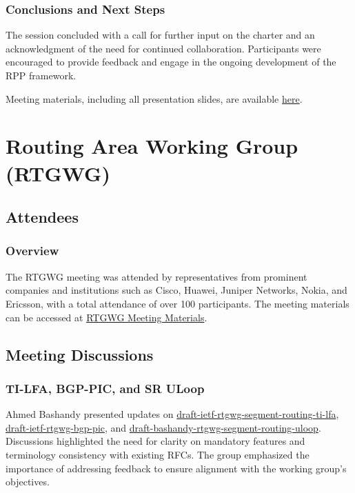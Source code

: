 \documentclass{article}
\begin{document}
\subsubsection{Conclusions and Next Steps}
The session concluded with a call for further input on the charter and an acknowledgment of the need for continued collaboration. Participants were encouraged to provide feedback and engage in the ongoing development of the RPP framework.

Meeting materials, including all presentation slides, are available \href{https://datatracker.ietf.org/meeting/121/materials/}{here}.



\newpage

\section{Routing Area Working Group (RTGWG)}

\subsection{Attendees}
\subsubsection{Overview}
The RTGWG meeting was attended by representatives from prominent companies and institutions such as Cisco, Huawei, Juniper Networks, Nokia, and Ericsson, with a total attendance of over 100 participants. The meeting materials can be accessed at \href{https://datatracker.ietf.org/meeting/121/session/rtgwg}{RTGWG Meeting Materials}.

\subsection{Meeting Discussions}

\subsubsection{TI-LFA, BGP-PIC, and SR ULoop}
Ahmed Bashandy presented updates on \href{https://datatracker.ietf.org/doc/html/draft-ietf-rtgwg-segment-routing-ti-lfa}{draft-ietf-rtgwg-segment-routing-ti-lfa}, \href{https://datatracker.ietf.org/doc/html/draft-ietf-rtgwg-bgp-pic}{draft-ietf-rtgwg-bgp-pic}, and \href{https://datatracker.ietf.org/doc/html/draft-bashandy-rtgwg-segment-routing-uloop}{draft-bashandy-rtgwg-segment-routing-uloop}. Discussions highlighted the need for clarity on mandatory features and terminology consistency with existing RFCs. The group emphasized the importance of addressing feedback to ensure alignment with the working group's objectives.
\end{document}
